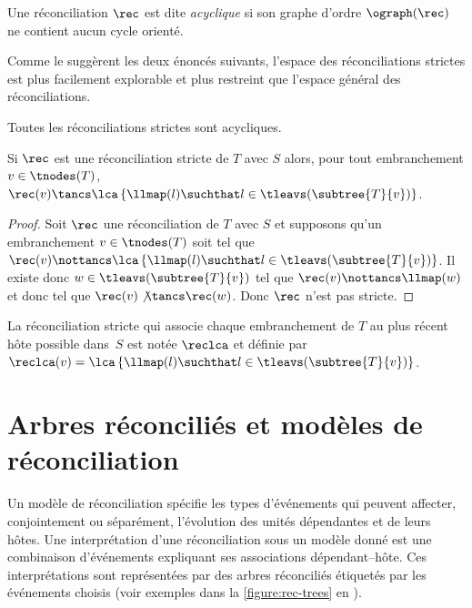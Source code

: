 \begin{definition}\label{definition:rec-acyclic}
    Une réconciliation \(\rec\) est dite \emph{acyclique} si son graphe d’ordre \(\ograph(\rec)\) ne contient aucun cycle orienté.
\end{definition}

Comme le suggèrent les deux énoncés suivants, l’espace des réconciliations strictes est plus facilement explorable et plus restreint que l’espace général des réconciliations.

\begin{remark}
    Toutes les réconciliations strictes sont acycliques.
\end{remark}

\begin{lemma}\label{lemma:strict-rec-space}
    Si \(\rec\) est une réconciliation stricte de \(T\) avec \(S\) alors, pour tout embranchement \(v \in \tnodes(T)\),
    \(\rec(v) \tancs \lca\left\{ \llmap(l) \suchthat l \in \tleavs(\subtree{T}{v}) \right\}\).
\end{lemma}
\vspace{-1em}
\begin{proof}
    Soit \(\rec\) une réconciliation de \(T\) avec \(S\) et supposons qu’un embranchement \(v \in \tnodes(T)\) soit tel que
    \(\rec(v) \nottancs \lca\left\{ \llmap(l) \suchthat l \in \tleavs(\subtree{T}{v}) \right\}\).
    Il existe donc \(w \in \tleavs(\subtree{T}{v})\) tel que \(\rec(v) \nottancs \llmap(w)\)
    et donc tel que \(\rec(v) \not\tancs \rec(w)\).
    Donc \(\rec\) n’est pas stricte.
\end{proof}

La réconciliation stricte qui associe chaque embranchement de \(T\) au plus récent hôte possible dans~\(S\) est notée \(\reclca\) et définie par \(
    \reclca(v) = \lca\left\{ \llmap(l) \suchthat l \in \tleavs(\subtree{T}{v}) \right\}
\).

\section{Arbres réconciliés et modèles de réconciliation}

Un modèle de réconciliation spécifie les types d’événements qui peuvent affecter, conjointement ou séparément, l’évolution des unités dépendantes et de leurs hôtes.
Une interprétation d’une réconciliation sous un modèle donné est une combinaison d’événements expliquant ses associations dépendant--hôte.
Ces interprétations sont représentées par des arbres réconciliés étiquetés par les événements choisis (voir exemples dans la \cref{figure:rec-trees} en ).

